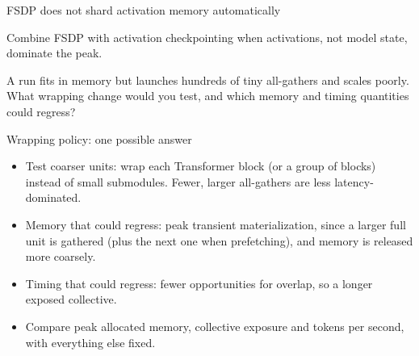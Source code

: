 \documentclass[handout]{beamer}
\begin{document}
\begin{frame}{FSDP does not shard activation memory automatically}
  \centering
  \par\vspace{8pt}
  \small Combine FSDP with activation checkpointing when activations, not model state, dominate the peak.
\end{frame}

{A run fits in memory but launches hundreds of tiny all-gathers and scales poorly. What wrapping change would you test, and which memory and timing quantities could regress?}

\begin{frame}{Wrapping policy: one possible answer}
  \begin{itemize}
      \setlength{\itemsep}{9pt}
    \item Test coarser units: wrap each Transformer block (or a group of blocks) instead of small submodules. Fewer, larger all-gathers are less latency-dominated.
    \item Memory that could regress: peak transient materialization, since a larger full unit is gathered (plus the next one when prefetching), and memory is released more coarsely.
    \item Timing that could regress: fewer opportunities for overlap, so a longer exposed collective.
    \item Compare peak allocated memory, collective exposure and tokens per second, with everything else fixed.
  \end{itemize}
\end{frame}
\end{document}

